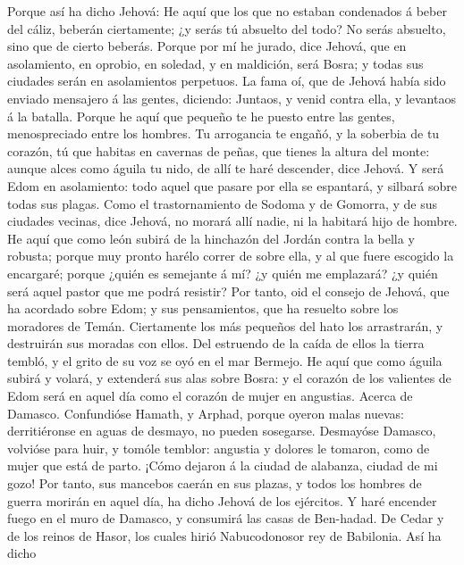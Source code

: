  Porque así ha dicho Jehová: He aquí que los que no estaban
condenados á beber del cáliz, beberán ciertamente; ¿y serás tú absuelto
del todo? No serás absuelto, sino que de cierto beberás. 
Porque por mí he jurado, dice Jehová, que en asolamiento, en oprobio, en
soledad, y en maldición, será Bosra; y todas sus ciudades serán en
asolamientos perpetuos.  La fama oí, que de Jehová había
sido enviado mensajero á las gentes, diciendo: Juntaos, y venid contra
ella, y levantaos á la batalla.  Porque he aquí que pequeño
te he puesto entre las gentes, menospreciado entre los hombres.
 Tu arrogancia te engañó, y la soberbia de tu corazón, tú
que habitas en cavernas de peñas, que tienes la altura del monte: aunque
alces como águila tu nido, de allí te haré descender, dice Jehová.
 Y será Edom en asolamiento: todo aquel que pasare por ella
se espantará, y silbará sobre todas sus plagas.  Como el
trastornamiento de Sodoma y de Gomorra, y de sus ciudades vecinas, dice
Jehová, no morará allí nadie, ni la habitará hijo de hombre.
 He aquí que como león subirá de la hinchazón del Jordán
contra la bella y robusta; porque muy pronto harélo correr de sobre
ella, y al que fuere escogido la encargaré; porque ¿quién es semejante á
mí? ¿y quién me emplazará? ¿y quién será aquel pastor que me podrá
resistir?  Por tanto, oid el consejo de Jehová, que ha
acordado sobre Edom; y sus pensamientos, que ha resuelto sobre los
moradores de Temán. Ciertamente los más pequeños del hato los
arrastrarán, y destruirán sus moradas con ellos.  Del
estruendo de la caída de ellos la tierra tembló, y el grito de su voz se
oyó en el mar Bermejo.  He aquí que como águila subirá y
volará, y extenderá sus alas sobre Bosra: y el corazón de los valientes
de Edom será en aquel día como el corazón de mujer en angustias.
 Acerca de Damasco. Confundióse Hamath, y Arphad, porque
oyeron malas nuevas: derritiéronse en aguas de desmayo, no pueden
sosegarse.  Desmayóse Damasco, volvióse para huir, y tomóle
temblor: angustia y dolores le tomaron, como de mujer que está de parto.
 ¡Cómo dejaron á la ciudad de alabanza, ciudad de mi gozo!
 Por tanto, sus mancebos caerán en sus plazas, y todos los
hombres de guerra morirán en aquel día, ha dicho Jehová de los
ejércitos.  Y haré encender fuego en el muro de Damasco, y
consumirá las casas de Ben-hadad.  De Cedar y de los reinos
de Hasor, los cuales hirió Nabucodonosor rey de Babilonia. Así ha dicho
